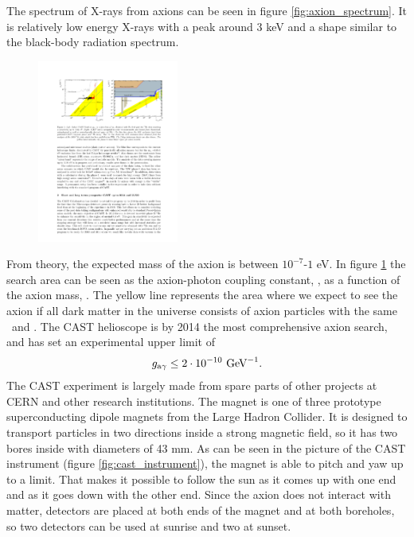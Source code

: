 The spectrum of X-rays from axions can be seen in figure \ref{fig:axion_spectrum}. It is relatively low energy X-rays with a peak around 3 keV and a shape similar to the black-body radiation spectrum.

\begin{figure}[htbp]
  \centering
    \includegraphics[height=6cm]{figures/cast/axion_search_cast.pdf}
  \caption{}
  \label{fig:axion_search_cast}
\end{figure}

From theory, the expected mass of the axion is between $10^{-7}$-$1$ eV. In figure \ref{fig:axion_search_cast} the search area can be seen as the axion-photon coupling constant, \gay, as a function of the axion mass, \maxion. The yellow line represents the area where we expect to see the axion if all dark matter in the universe consists of axion particles with the same \maxion\ and \gay. The CAST helioscope is by 2014 the most comprehensive axion search, and has set an experimental upper limit of
\begin{eqnarray}
g_{\textrm{a$\gamma$}} \leq 2 \cdot 10^{-10} \textrm{ GeV}^{-1}.
\end{eqnarray}
The CAST experiment is largely made from spare parts of other projects at CERN and other research institutions. The magnet is one of three prototype superconducting dipole magnets from the Large Hadron Collider. It is designed to transport particles in two directions inside a strong magnetic field, so it has two bores inside with diameters of 43 mm. As can be seen in the picture of the CAST instrument (figure \ref{fig:cast_instrument}), the magnet is able to pitch and yaw up to a limit. That makes it possible to follow the sun as it comes up with one end and as it goes down with the other end. Since the axion does not interact with matter, detectors are placed at both ends of the magnet and at both boreholes, so two detectors can be used at sunrise and two at sunset.

